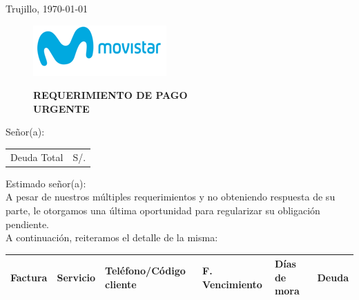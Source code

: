 %
%

\begin{flushright}
    Trujillo, \today
\end{flushright}
\vspace{-0.5cm}

\begin{figure}[h]
\begin{minipage}[b]{5.106458333cm}
\includegraphics[natwidth=5.106458333cm, natheight=1.931458333cm]{resources/business_logo.png}
\end{minipage}
\begin{minipage}[b][1.9314cm][t]{11cm}
\hfill
\begin{flushright}
{\LARGE \bf REQUERIMIENTO DE PAGO\\URGENTE}
\end{flushright}
\end{minipage}
\end{figure}

\noindent
Señor(a):\\

\begin{flushright}
\bf \large
\begin{tabular}{|p{3.2cm} p{3.2cm}|}
\hline
Deuda Total & S/. %
\hline
\end{tabular}
\end{flushright}

\noindent
Estimado señor(a):\\
A pesar de nuestros múltiples requerimientos y no obteniendo respuesta de su parte, le otorgamos una última oportunidad para regularizar su obligación pendiente.\\

\noindent A continuación, reiteramos el detalle de la misma:
\begin{center}
\scriptsize
\begin{tabular}{|x{1.2cm}|x{2cm}|x{3.5cm}|x{2.5cm}|x{2cm}|x{2cm}|}
\hline
\textbf{Factura} & \textbf{Servicio} & \textbf{Teléfono/Código cliente} & \textbf{F. Vencimiento} & \textbf{Días de mora} & \textbf{Deuda} \\
\hline
\hline
\end{tabular}
\end{center}

